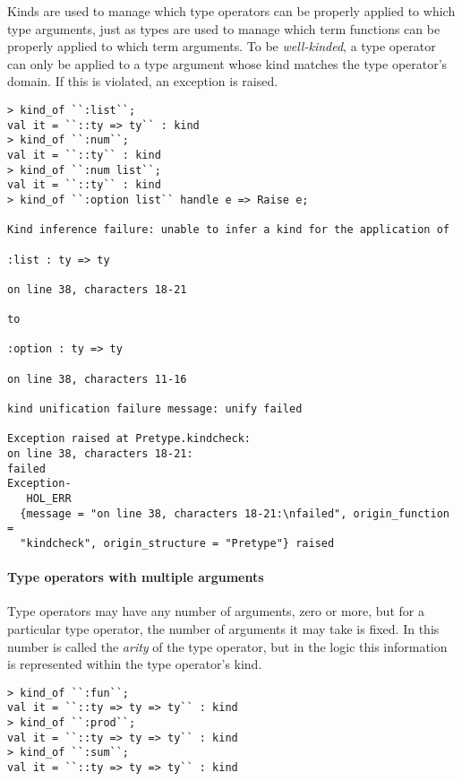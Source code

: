 Kinds are used to manage which type operators can be properly applied to
which type arguments, just as types are used to manage which term functions
can be properly applied to which term arguments.  To be {\it well-kinded},
a type operator can only be applied to a type argument whose kind matches
the type operator's domain.  If this is violated, an exception is raised.
%
\begin{session}
\begin{verbatim}
> kind_of ``:list``;
val it = ``::ty => ty`` : kind
> kind_of ``:num``;
val it = ``::ty`` : kind
> kind_of ``:num list``;
val it = ``::ty`` : kind
> kind_of ``:option list`` handle e => Raise e;

Kind inference failure: unable to infer a kind for the application of

:list : ty => ty

on line 38, characters 18-21

to

:option : ty => ty

on line 38, characters 11-16

kind unification failure message: unify failed

Exception raised at Pretype.kindcheck:
on line 38, characters 18-21:
failed
Exception-
   HOL_ERR
  {message = "on line 38, characters 18-21:\nfailed", origin_function =
  "kindcheck", origin_structure = "Pretype"} raised
\end{verbatim}
\end{session}

\paragraph{Type operators with multiple arguments}

Type operators may have any number of arguments, zero or more, but for a
particular type operator, the number of arguments it may take is fixed.  In
\HOL{} this  number is called the {\it arity\/} of the type operator, but in
the \HOLW{} logic this information is represented within the type operator's
kind.
%
\begin{session}
\begin{verbatim}
> kind_of ``:fun``;
val it = ``::ty => ty => ty`` : kind
> kind_of ``:prod``;
val it = ``::ty => ty => ty`` : kind
> kind_of ``:sum``;
val it = ``::ty => ty => ty`` : kind
\end{verbatim}
\end{session}

